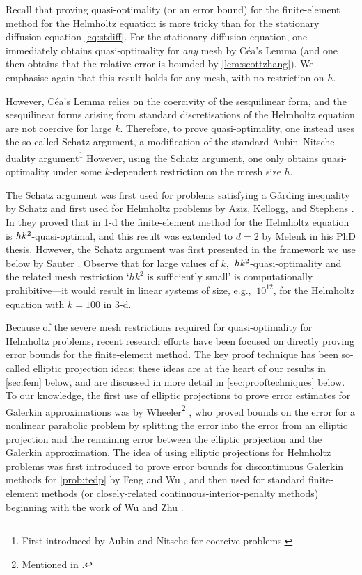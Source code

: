Recall that proving quasi-optimality (or an error bound) for the finite-element method for the Helmholtz equation is more tricky than for the stationary diffusion equation \cref{eq:stdiff}. For the stationary diffusion equation, one immediately obtains quasi-optimality for \emph{any} mesh by C\'ea's Lemma (and one then obtains that the relative error is bounded by \cref{lem:scottzhang}). We emphasise again that this result holds for any mesh, with no restriction on $h.$

However, C\'ea's Lemma relies on the coercivity of the sesquilinear form, and the sesquilinear forms arising from standard discretisations of the Helmholtz equation are not coercive for large $k$. Therefore, to prove quasi-optimality, one instead uses the so-called Schatz argument, a modification of the standard Aubin--Nitsche duality argument\footnote{First introduced by Aubin \cite{Au:67} and Nitsche \cite{Ni:68} for coercive problems.} However, using the Schatz argument, one only obtains quasi-optimality under some $k$-dependent restriction on the mresh size $h.$

The Schatz argument was first used for problems satisfying a G\r{a}rding inequality by Schatz \cite{Sc:74} and first used for Helmholtz problems by Aziz, Kellogg, and Stephens \cite{AzKeSt:88}. In \cite{AzKeSt:88} they proved that in 1-d the finite-element method for the Helmholtz equation is $hk^{2}$-quasi-optimal, and this result was extended to $d=2$ by Melenk \cite{Me:95} in his PhD thesis. However, the Schatz argument was first presented in the framework we use below by Sauter \cite[Section 2]{Sa:06}. Observe that for large values of $k,$ $hk^{2}$-quasi-optimality and the related mesh restriction `$hk^2$ is sufficiently small' is computationally prohibitive---it would result in linear systems of size, e.g., $~10^{12}$, for the Helmholtz equation with $k=100$ in 3-d.

Because of the severe mesh restrictions required for quasi-optimality for Helmholtz problems, recent research efforts have been focused on directly proving error bounds for the finite-element method. The key proof technique has been so-called elliptic projection ideas; these ideas are at the heart of our results in \cref{sec:fem} below, and are discussed in more detail in \cref{sec:prooftechniques} below. To our knowledge, the first use of elliptic projections to prove error estimates for Galerkin approximations was by Wheeler\footnote{Mentioned in \cite{MaNo:03}.} \cite[Theorem 3.1 ff.]{Wh:73}, who proved bounds on the error for a nonlinear parabolic problem by splitting the error into the error from an elliptic projection and the remaining error between the elliptic projection and the Galerkin approximation. The idea of using elliptic projections for Helmholtz problems was first introduced to prove error bounds for discontinuous Galerkin methods for \cref{prob:tedp} by Feng and Wu \cite{FeWu:09,FeWu:11}, and then used for standard finite-element methods (or closely-related continuous-interior-penalty methods) beginning with the work of Wu and Zhu \cite{ZhWu:13,Wu:14}.


